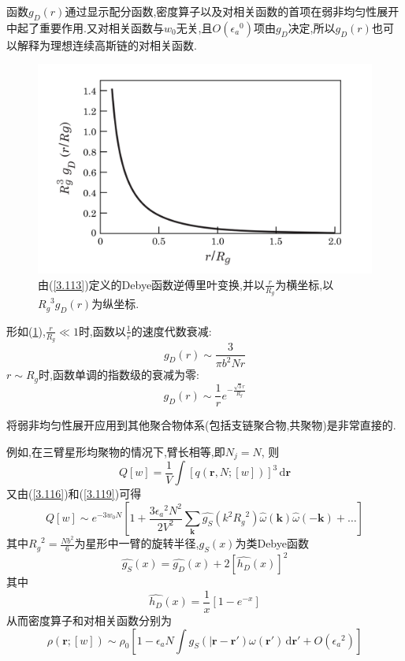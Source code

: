函数$g_D(r)$通过显示配分函数,密度算子以及对相关函数的首项在弱非均匀性展开中起了重要作用.又对相关函数与$w_0$无关,且$O({\epsilon_a}^0)$项由$g_D$决定,所以$g_D(r)$也可以解释为理想连续高斯链的对相关函数.
\begin{figure}[H]
	\centering
	\includegraphics[scale=0.4]{./figures/FIG3-9.png}
	\caption{由(\ref{3.113})定义的Debye函数逆傅里叶变换,并以$\frac{r}{R_g}$为横坐标,以${R_g}^3 g_D(r)$为纵坐标.}
	\label{FIG3.9}
\end{figure}

形如(\ref{FIG3.9}),$\frac{r}{R_g} \ll 1$时,函数以$\frac{1}{r}$的速度代数衰减:
\begin{equation}
g_D(r) \sim \frac{3}{\pi b^2 N r}
\end{equation}
$r \sim R_g$时,函数单调的指数级的衰减为零:
$$g_D(r) \sim \frac{1}{r} e^{-\frac{\sqrt{3}r}{R_g}}$$

将弱非均匀性展开应用到其他聚合物体系(包括支链聚合物,共聚物)是非常直接的.

例如,在三臂星形均聚物的情况下,臂长相等,即$N_j = N$,
则
\begin{equation}
Q[w] = \frac{1}{V} \int [q(\mathbf{r},N;[w])]^3\,\mathrm{d} \mathbf{r}
\end{equation}
又由(\ref{3.116})和(\ref{3.119})可得
\begin{equation}
Q[w] \sim e^{-3w_0 N} [1+\frac{3 {\epsilon_a}^2 N^2}{2V^2} \sum_{\mathbf{k}} \hat{g_S}(k^2 {R_g}^2)\hat{\omega}(\mathbf{k})\hat{\omega}(-\mathbf{k})+\dots]
\end{equation}
其中${R_g}^2 = \frac{Nb^2}{6}$为星形中一臂的旋转半径,$g_S(x)$为类Debye函数
\begin{equation}
\hat{g_S}(x) = \hat{g_D}(x) + 2[\hat{h_D}(x)]^2
\end{equation}
其中
\begin{equation}
\hat{h_D}(x) = \frac{1}{x} [1-e^{-x}]
\end{equation}
从而密度算子和对相关函数分别为
\begin{equation}
\rho(\mathbf{r};[w]) \sim \rho_0[1-\epsilon_a N \int g_S(|\mathbf{r}-\mathbf{r}') \omega(\mathbf{r}')\,\mathrm{d} \mathbf{r}'+O({\epsilon_a}^2)]
\end{equation}

